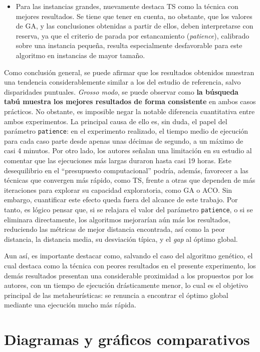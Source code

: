 \begin{itemize}
  \item Para las instancias grandes, nuevamente destaca TS como la técnica con mejores resultados. Se tiene que tener en cuenta, 
  no obstante, que los valores de GA, y las conclusiones obtenidas a partir de ellos, deben interpretarse con reserva, ya que el
  criterio de parada por estancamiento (\textit{patience}), calibrado sobre una instancia pequeña, resulta especialmente
  desfavorable para este algoritmo en instancias de mayor tamaño.
\end{itemize}

Como conclusión general, se puede afirmar que los resultados obtenidos muestran una tendencia considerablemente similar a los del 
estudio de referencia, salvo disparidades puntuales. \textit{Grosso modo}, se puede observar como \textbf{la búsqueda tabú
muestra los mejores resultados de forma consistente} en ambos casos prácticos. No obstante, es imposible negar la notable diferencia 
cuantitativa entre ambos experimentos. La principal causa de ello es, sin duda, el papel del parámetro \texttt{patience}:
en el experimento realizado, el tiempo medio de ejecución para cada caso parte desde apenas unas décimas de segundo, a un 
máximo de casi 4 minutos. Por otro lado, los autores señalan una limitación en su estudio al comentar que las ejecuciones más
largas duraron hasta casi 19 horas. Este desequilibrio en el ``presupuesto computacional'' podría, además, favorecer a las
técnicas que convergen más rápido, como TS, frente a otras que dependen de más iteraciones para explorar su capacidad exploratoria,
como GA o ACO. Sin embargo, cuantificar este efecto queda fuera del alcance de este trabajo. Por tanto, es lógico pensar que, si
se relajara el valor del parámetro \texttt{patience}, o si se eliminara directamente, los algoritmos mejorarían aún más los 
resultados, reduciendo las métricas de mejor distancia encontrada, así como la peor distancia, la distancia media, su desviación
típica, y el \textit{gap} al óptimo global.

Aun así, es importante destacar como, salvando el caso del algoritmo genético, el cual destaca como la técnica con peores 
resultados en el presente experimento, los demás resultados presentan una considerable proximidad a los propuestos por los 
autores, con un tiempo de ejecución drásticamente menor, lo cual es el objetivo principal de las metaheurísticas: se renuncia 
a encontrar el óptimo global mediante una ejecución mucho más rápida.

\newpage

\section{Diagramas y gráficos comparativos}
\label{sec:graphs}

